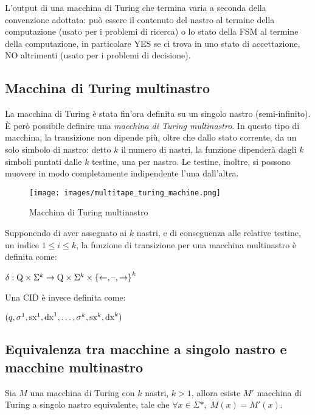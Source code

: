 L'output di una macchina di Turing che termina varia a seconda della convenzione adottata: può essere il contenuto del nastro al termine della computazione (usato per i problemi di ricerca) o lo stato della FSM al termine della computazione, in particolare YES se ci trova in uno stato di accettazione, NO altrimenti (usato per i problemi di decisione).

\subsection*{Macchina di Turing multinastro}
La macchina di Turing è stata fin'ora definita su un singolo nastro (semi-infinito).
È però possibile definire una \textit{macchina di Turing multinastro}.
In questo tipo di macchina, la transizione non dipende più, oltre che dallo stato corrente, da un solo simbolo di nastro: detto $k$ il numero di nastri, la funzione dipenderà dagli $k$ simboli puntati dalle $k$ testine, una per nastro. Le testine, inoltre, si possono muovere in modo completamente indipendente l'una dall'altra.
\begin{figure}[h]
    \centering
    \texttt{[image: images/multitape\_turing\_machine.png]}
    \caption{Macchina di Turing multinastro}
    \label{fig:multitape-turing-machine}
\end{figure}
Supponendo di aver assegnato ai $k$ nastri, e di conseguenza alle relative testine, un indice $1 \le i \le k$, la funzione di transizione per una macchina multinastro è definita come:
\begin{center}
    $\delta: \textnormal{Q} \times \Sigma^k \rightarrow \textnormal{Q} \times \Sigma^k \times \left\{ \leftarrow, \textnormal{\textendash}, \rightarrow \right\}^k$
\end{center}
Una CID è invece definita come:
\begin{center}
    $(q, \sigma^1, \textnormal{sx}^1, \textnormal{dx}^1, \ldots, \sigma^k, \textnormal{sx}^k, \textnormal{dx}^k)$
\end{center}

\subsection*{Equivalenza tra macchine a singolo nastro e macchine multinastro}
\begin{thm}
    Sia $M$ una macchina di Turing con $k$ nastri, $k>1$, allora esiste $M'$ macchina di Turing a singolo nastro equivalente, tale che $\forall x \in \Sigma*, \; M(x) = M'(x)$.
\end{thm}

